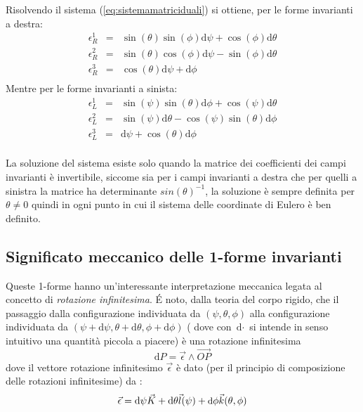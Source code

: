 \documentclass[11pt]{report}
\theoremstyle{plain}
\theoremstyle{definition}
\theoremstyle{remark}
\begin{document}
Risolvendo il sistema (\ref{eq:sistemamatriciduali}) si ottiene, per le forme invarianti a destra:
\begin{equation}\label{eq:formeinvariantisinistracomponenti}
\begin{array}{rcl}
\epsilon_{R}^{1} & = & \sin(\theta) \sin(\phi) \textrm{d}\psi + \cos(\phi)\textrm{d}\theta \\
\epsilon_{R}^{2} & = & \sin(\theta)\cos(\phi)\textrm{d}\psi - \sin(\phi)\textrm{d}\theta \\
\epsilon_{R}^{3} & = & \cos(\theta)\textrm{d}\psi + \textrm{d}\phi \\
\end{array}
\end{equation} 
Mentre per le forme invarianti a sinista:
\begin{equation}\label{eq:formeinvariantidestracomponenti}
\begin{array}{rcl}
\epsilon_{L}^{1} & = & \sin(\psi)\sin(\theta)\textrm{d}\phi + \cos(\psi)\textrm{d}\theta  \\
\epsilon_{L}^{2} & = & \sin(\psi)\textrm{d} \theta - \cos(\psi)\sin(\theta)\textrm{d}\phi \\
\epsilon_{L}^{3} & = & \textrm{d}\psi + \cos(\theta)\textrm{d}\phi \\
\end{array}
\end{equation}

La soluzione del sistema esiste solo quando la matrice dei coefficienti dei campi invarianti è invertibile, siccome sia per i campi invarianti a destra che per quelli a sinistra la matrice ha determinante $ sin(\theta)^{-1}$, la soluzione è sempre definita per $ \theta\neq 0$ quindi in ogni punto in cui il sistema delle coordinate di Eulero è ben definito.

\subsection{Significato meccanico delle 1-forme invarianti}
Queste 1-forme hanno un'interessante interpretazione meccanica legata al concetto di \emph{rotazione infinitesima}.
É noto, dalla teoria del corpo rigido, che il passaggio dalla configurazione individuata da $(\psi, \theta , \phi)$ alla configurazione individuata da $(\psi + \textrm{d}\psi, \theta + \textrm{d}\theta , \phi + \textrm{d}\phi )$ ( dove con $\textrm{d}\cdot$ si intende in senso intuitivo una quantità piccola a piacere) è una rotazione infinitesima
\begin{displaymath}
\textrm{d} P = \vec{\epsilon} \wedge \vec{OP}
\end{displaymath}
dove il vettore rotazione infinitesimo $\vec{\epsilon}$ è dato (per il principio di composizione delle rotazioni infinitesime) da :
\begin{displaymath}
\vec{\epsilon} = \textrm{d}\psi \vec{K} + \textrm{d}\theta \vec{l}\small(\psi)+ \textrm{d}\phi \vec{k}(\small\theta,\phi)
\end{displaymath}
\end{document}
